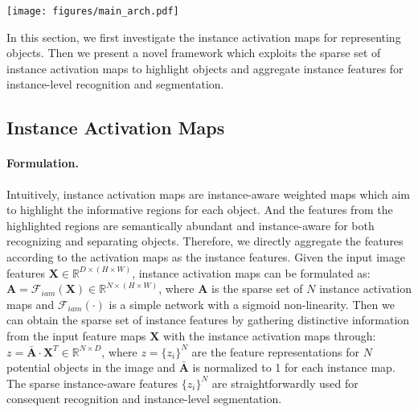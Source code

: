 \documentclass[10pt,twocolumn,letterpaper]{article}
\newcommand{\name}{SparseInst}
\begin{document}
\begin{figure*}
    \centering
    \texttt{[image: figures/main\_arch.pdf]}
    \vspace{-5pt}
    \caption{\textbf{The architecture of \name.} \name~contains three main components: \textit{backbone}, \textit{encoder} and \textit{IAM-based decoder}. 
    Given the input image, the backbone extracts the multi-scale image features (\ie, \{C$_3$,C$_4$,C$_5$\}). The encoder employs pyramid pooling module (PPM)~\cite{ZhaoSQWJ17} to enlarge the receptive field and fuses the multi-scale features. `$4\times$'or `$2\times$' denote the upsampling by a factor 4 or 2. The IAM-based decoder consists of two branches, \ie an instance branch and a mask branch. In the instance branch, the `IAM' module predicts the instance activation maps (shown in the right column) to acquire the instance features $\{z_i\}^N$ for recognition and mask kernels. The mask branch aims to provide mask features $\mathbf{M}$ and  will be multiplied with the predicted kernels to generate segmentation masks.}
    \label{fig:main_arch}
    \vspace{-10pt}
\end{figure*}


In this section, we first investigate the instance activation maps for representing objects.
Then we present a novel framework which exploits the sparse set of instance activation maps to highlight objects and aggregate instance features for instance-level recognition and segmentation.


\subsection{Instance Activation Maps}
\label{sec:instance_activaion_maps}
\paragraph{Formulation.}
Intuitively, instance activation maps are instance-aware weighted maps which aim to highlight the informative regions for each object.
And the features from the highlighted regions are semantically abundant and instance-aware for both recognizing and separating objects. 
Therefore, we directly aggregate the features according to the  activation maps as the instance features.
Given the input image features $\mathbf{X} \in \mathbb{R}^{D\times (H\times W)}$,  instance activation maps can be formulated as: $\mathbf{A} \!=\! \mathcal{F}_{iam}(\mathbf{X}) \in \mathbb{R}^{N\times (H\times W)}$,
where $\mathbf{A}$ is the sparse set of $N$ instance activation maps and  $\mathcal{F}_{iam}(\cdot)$ is a simple network with a sigmoid non-linearity.
Then we can obtain the sparse set of instance features by gathering distinctive information from the input feature maps $\mathbf{X}$ with the instance activation maps through: $z \!=\! \bar{\mathbf{A}}\cdot\mathbf{X}^T \in \mathbb{R}^{N\times D}$,
where $z=\{z_i\}^N$ are the feature representations for $N$ potential objects in the image and $\bar{\mathbf{A}}$ is normalized to 1 for each instance map. The sparse instance-aware features $\{z_i\}^N$ are straightforwardly used for consequent recognition and instance-level segmentation.
\end{document}
